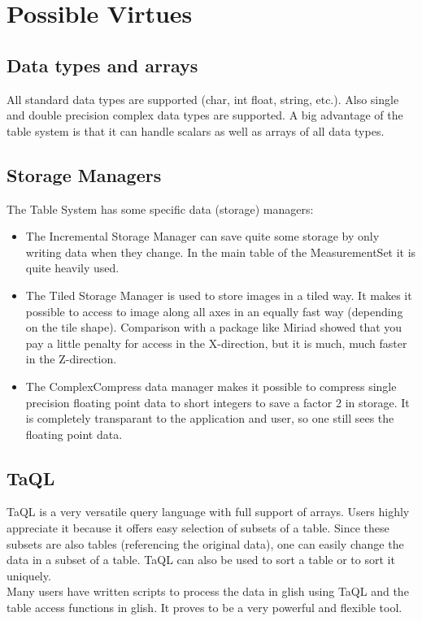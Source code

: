 \section{Possible Virtues}
\subsection{Data types and arrays}
All standard data types are supported (char, int float, string, etc.).
Also single and double precision complex data types are supported.
A big advantage of the table system is that it can handle scalars as well
as arrays of all data types.

\subsection{Storage Managers}
The Table System has some specific data (storage) managers:
\begin{itemize}
\item
 The Incremental Storage Manager can save quite some storage by only
 writing data when they change. In the main table of the MeasurementSet
 it is quite heavily used.
\item
 The Tiled Storage Manager is used to store images in a tiled way.
 It makes it possible to access to image along all axes in an equally
 fast way (depending on the tile shape). Comparison with a package
 like Miriad showed that you pay a little penalty for access in the
 X-direction, but it is much, much faster in the Z-direction.
\item
 The ComplexCompress data manager makes it possible to compress single
 precision floating point data to short integers to save a factor 2
 in storage. It is completely transparant to the application and user,
 so one still sees the floating point data.
\end{itemize}

\subsection{TaQL}
TaQL is a very versatile query language with full support of arrays.
Users highly appreciate it because it offers easy selection of subsets
of a table. Since these subsets are also tables (referencing the
original data), one can easily change the data in a subset of a table.
TaQL can also be used to sort a table or to sort it uniquely.
\\Many users have written scripts to process the data in glish using 
TaQL and the table access functions in glish. It proves to be a very
powerful and flexible tool.


